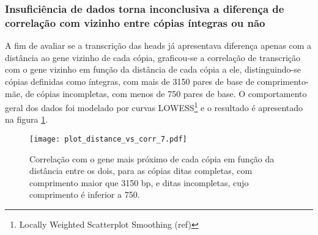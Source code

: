 \documentclass[12pt]{article}
\begin{document}
\begin{multicols}{2}
\subsubsection{Insuficiência de dados torna inconclusiva a diferença de correlação com vizinho entre cópias íntegras ou não}
A fim de avaliar se a transcrição das heads já apresentava diferença apenas com a distância ao gene vizinho de cada cópia, graficou-se a correlação de transcrição com o gene vizinho em função da distância de cada cópia a ele, distinguindo-se cópias definidas como íntegras, com mais de 3150 pares de base de comprimento-mãe, de cópias incompletas, com menos de 750 pares de base. O comportamento geral dos dados foi modelado por curvas LOWESS\footnote{Locally Weighted Scatterplot Smoothing (ref)} e o resultado é apresentado na figura \ref{completude}.

\begin{figure}[H]
	\centering
	\label{completude}
	\texttt{[image: plot\_distance\_vs\_corr\_7.pdf]}
	\caption{Correlação com o gene mais próximo de cada cópia em função da distância entre os dois, para as cópias ditas completas, com comprimento maior que 3150 bp, e ditas incompletas, cujo comprimento é inferior a 750.}
\end{figure}

% 



\end{multicols}
\end{document}

